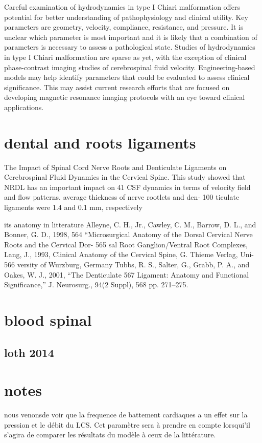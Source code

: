 \documentclass{report}
\begin{document}
Careful examination of hydrodynamics in type I
Chiari malformation offers potential for better
understanding of pathophysiology and clinical utility.
Key parameters are geometry, velocity, compliance,
resistance, and pressure. It is unclear which parameter
is most important and it is likely that a
combination of parameters is necessary to assess a
pathological state. Studies of hydrodynamics in type I
Chiari malformation are sparse as yet, with the
exception of clinical phase-contrast imaging studies
of cerebrospinal fluid velocity. Engineering-based
models may help identify parameters that could be
evaluated to assess clinical significance. This may
assist current research efforts that are focused on
developing magnetic resonance imaging protocols
with an eye toward clinical applications.

\section{dental and roots ligaments}
The Impact of Spinal Cord
 Nerve Roots and Denticulate Ligaments on Cerebrospinal Fluid Dynamics in
 the Cervical Spine. This study showed that NRDL has an important impact on
41 CSF dynamics in terms of velocity field and flow patterns.
average thickness of nerve rootlets and den- 100
ticulate ligaments were 1.4 and 0.1 mm, respectively

its anatomy in litterature
Alleyne, C. H., Jr., Cawley, C. M., Barrow, D. L., and Bonner, G. D., 1998,
564 “Microsurgical Anatomy of the Dorsal Cervical Nerve Roots and the Cervical Dor-
565 sal Root Ganglion/Ventral Root Complexes,
Lang, J., 1993, Clinical Anatomy of the Cervical Spine, G. Thieme Verlag, Uni-
566 versity of Wurzburg, Germany
Tubbs, R. S., Salter, G., Grabb, P. A., and Oakes, W. J., 2001, “The Denticulate
567 Ligament: Anatomy and Functional Significance,” J. Neurosurg., 94(2 Suppl),
568 pp. 271–275.

\section{blood spinal}
\subsection{loth 2014}


\section{notes}
nous venonsde voir que la frequence de battement cardiaques a un effet sur la pression et le débit du LCS. Cet paramètre sera à prendre en compte lorsqui'il s'agira de comparer les résultats du modèle à ceux de la littérature.


\end{document}
